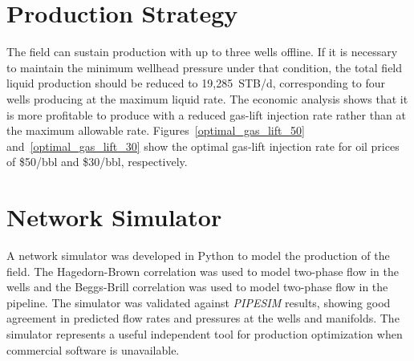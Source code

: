 \section{Production Strategy}

The field can sustain production with up to three wells offline. If it is
necessary to maintain the minimum wellhead pressure under that condition, the
total field liquid production should be reduced to 19,285~STB/d, corresponding
to four wells producing at the maximum liquid rate.
The economic analysis shows that it is more profitable to produce with a reduced
gas-lift injection rate rather than at the maximum allowable rate.
Figures~\ref{optimal_gas_lift_50} and~\ref{optimal_gas_lift_30} show the optimal
gas-lift injection rate for oil prices of \$50/bbl and \$30/bbl, respectively.

\section{Network Simulator}

A network simulator was developed in Python to model the
production of the field. The Hagedorn-Brown correlation \cite{HagedornBrown1965}
was used to model two-phase flow in the wells and the Beggs-Brill correlation
\cite{BeggsBrill1973} was used to model two-phase flow in the pipeline.
The simulator was validated against \emph{PIPESIM} \cite{Schlumberger2023}
results, showing good agreement in predicted flow rates and pressures at the
wells and manifolds. The simulator represents a useful independent tool for
production optimization when commercial software is unavailable.